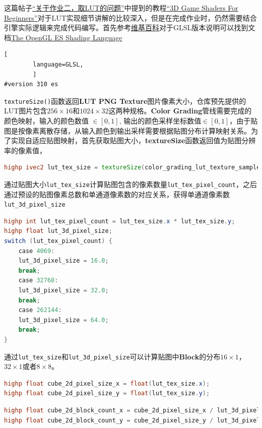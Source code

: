\documentclass{ctexart}
\begin{document}
    这篇帖子\href{https://games-cn.org/forums/topic/guanyuzuoyeerqulutdewenti/}{“关于作业二，取LUT的问题”}中提到的教程\href{https://games-cn.org/forums/topic/guanyuzuoyeerqulutdewenti/}{“3D Game Shaders For Beginners”}对于LUT实现细节讲解的比较深入，但是在完成作业时，仍然需要结合引擎实际逻辑来完成代码编写。首先参考\href{https://en.wikipedia.org/wiki/OpenGL_Shading_Language}{维基百科}对于GLSL版本说明可以找到文档\href{https://registry.khronos.org/OpenGL/specs/es/3.1/GLSL_ES_Specification_3.10.withchanges.pdf}{The OpenGL ES Shading Language}    
    \begin{lstlisting}[
        language=GLSL,
        ]
#version 310 es
    \end{lstlisting}
    \verb|textureSize()|函数返回\textbf{LUT PNG Texture}图片像素大小，仓库预先提供的LUT图片包含$ 256\times16 $和$ 1024\times32 $这两种规格。\textbf{Color Grading}管线需要完成的颜色映射，输入的颜色数值 $ \in [0,1] $, 输出的颜色采样坐标数值$ \in [0,1] $，由于贴图是按像素离散存储，从输入颜色到输出采样需要根据贴图分布计算映射关系。为了实现自适应贴图映射，首先获取贴图大小，\textbf{textureSize}函数返回值为贴图分辨率的像素值，
    \begin{lstlisting}[language=GLSL]
highp ivec2 lut_tex_size = textureSize(color_grading_lut_texture_sampler, 0);
    \end{lstlisting}
    通过贴图大小\verb|lut_tex_size|计算贴图包含的像素数量\verb|lut_tex_pixel_count|，之后通过预设的贴图像素总数和单通道像素数的对应关系，获得单通道像素数\verb|lut_3d_pixel_size|
    \begin{lstlisting}[language=GLSL]
highp int lut_tex_pixel_count = lut_tex_size.x * lut_tex_size.y;
highp float lut_3d_pixel_size;    
switch (lut_tex_pixel_count) {
    case 4069:
    lut_3d_pixel_size = 16.0;
    break;
    case 32768:
    lut_3d_pixel_size = 32.0;
    break;
    case 262144:
    lut_3d_pixel_size = 64.0;
    break;
}
    \end{lstlisting}    
    通过\verb|lut_tex_size|和\verb|lut_3d_pixel_size|可以计算贴图中\textbf{Block}的分布$ 16\times1 $，$ 32\times1 $或者$ 8\times8 $。
    \begin{lstlisting}[language=GLSL]
highp float cube_2d_pixel_size_x = float(lut_tex_size.x);
highp float cube_2d_pixel_size_y = float(lut_tex_size.y);
    \end{lstlisting}
    \begin{lstlisting}[language=GLSL]
highp float cube_2d_block_count_x = cube_2d_pixel_size_x / lut_3d_pixel_size;
highp float cube_2d_block_count_y = cube_2d_pixel_size_y / lut_3d_pixel_size;
    \end{lstlisting}
\end{document}
